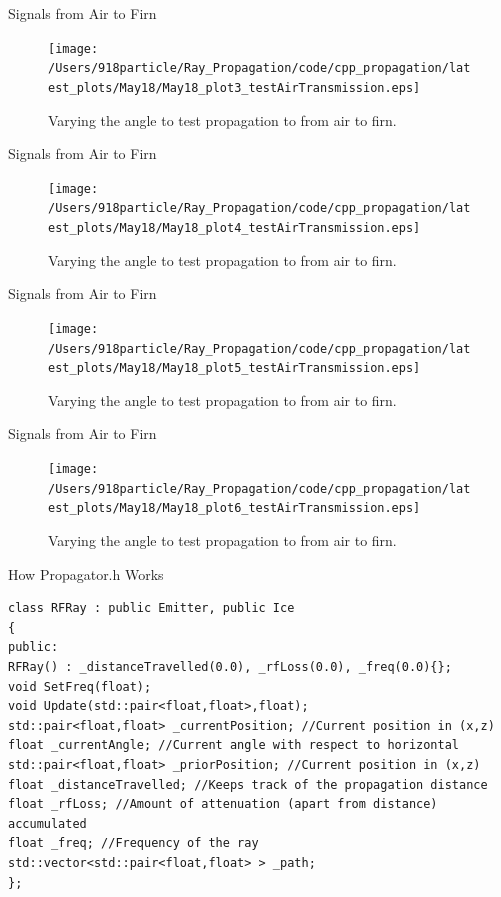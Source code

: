 \documentclass{beamer}
\begin{document}
\begin{frame}{Signals from Air to Firn}
\begin{figure}
\begin{center}
\texttt{[image: /Users/918particle/Ray\_Propagation/code/cpp\_propagation/latest\_plots/May18/May18\_plot3\_testAirTransmission.eps]}
\caption{\label{fig:fig14} Varying the angle to test propagation to from air to firn.}
\end{center}
\end{figure}
\end{frame}

\begin{frame}{Signals from Air to Firn}
\begin{figure}
\begin{center}
\texttt{[image: /Users/918particle/Ray\_Propagation/code/cpp\_propagation/latest\_plots/May18/May18\_plot4\_testAirTransmission.eps]}
\caption{\label{fig:fig15} Varying the angle to test propagation to from air to firn.}
\end{center}
\end{figure}
\end{frame}

\begin{frame}{Signals from Air to Firn}
\begin{figure}
\begin{center}
\texttt{[image: /Users/918particle/Ray\_Propagation/code/cpp\_propagation/latest\_plots/May18/May18\_plot5\_testAirTransmission.eps]}
\caption{\label{fig:fig16} Varying the angle to test propagation to from air to firn.}
\end{center}
\end{figure}
\end{frame}

\begin{frame}{Signals from Air to Firn}
\begin{figure}
\begin{center}
\texttt{[image: /Users/918particle/Ray\_Propagation/code/cpp\_propagation/latest\_plots/May18/May18\_plot6\_testAirTransmission.eps]}
\caption{\label{fig:fig17} Varying the angle to test propagation to from air to firn.}
\end{center}
\end{figure}
\end{frame}

\begin{frame}[fragile]{How Propagator.h Works}
\small 
\begin{verbatim}
class RFRay : public Emitter, public Ice
{
public:
RFRay() : _distanceTravelled(0.0), _rfLoss(0.0), _freq(0.0){};
void SetFreq(float);
void Update(std::pair<float,float>,float);
std::pair<float,float> _currentPosition; //Current position in (x,z)
float _currentAngle; //Current angle with respect to horizontal
std::pair<float,float> _priorPosition; //Current position in (x,z)
float _distanceTravelled; //Keeps track of the propagation distance
float _rfLoss; //Amount of attenuation (apart from distance) accumulated
float _freq; //Frequency of the ray
std::vector<std::pair<float,float> > _path;
};
\end{verbatim}
\end{frame}
\end{document}

